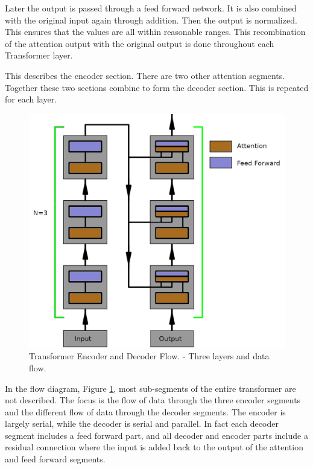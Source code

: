 Later the output is passed through a feed forward network. It is also combined with the original input again through addition. Then the output is normalized. This ensures that the values are all within reasonable ranges. This recombination of the attention output with the original output is done throughout each Transformer layer.

This describes the encoder section. There are two other attention segments. Together these two sections combine to form the decoder section. This is repeated for each layer.

\begin{figure}[H]
	\begin{center}
		
		
		\includegraphics[scale=1.0]{diagram-flow1}
	\end{center}
	\caption[Transformer Encoder and Decoder Flow]{Transformer Encoder and Decoder Flow. - Three layers and data flow.}
	\label{diagram-flow1}
	
\end{figure}

In the flow diagram, Figure \ref{diagram-flow1}, most sub-segments of the entire transformer are not described. The focus is the flow of data through the three encoder segments and the different flow of data through the decoder segments. The encoder is largely serial, while the decoder is serial and parallel. In fact each decoder segment includes a feed forward part, and all decoder and encoder parts include a residual connection where the input is added back to the output of the attention and feed forward segments.


